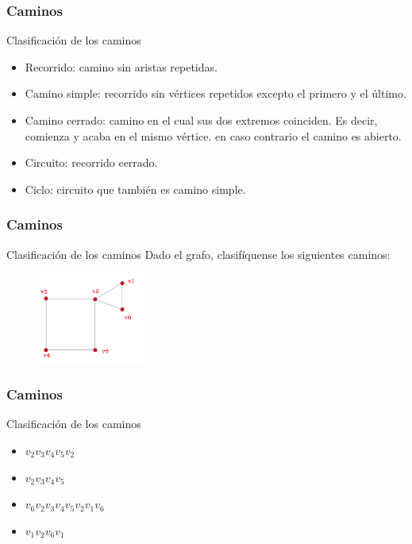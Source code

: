 \documentclass{beamer}
\begin{document}
\begin{frame}
\frametitle{Caminos}
\begin{block}{Clasificaci\'on de los caminos}
\begin{itemize}
\item Recorrido: camino sin aristas repetidas.
\item Camino simple: recorrido sin v\'ertices repetidos excepto el primero y el \'ultimo.
\item Camino cerrado: camino en el cual sus dos extremos coinciden. Es decir, comienza y acaba en el mismo v\'ertice. en caso contrario el camino es abierto.
\item Circuito: recorrido cerrado.
\item Ciclo: circuito que tambi\'en es camino simple.
\end{itemize}
\end{block}
\end{frame}






\begin{frame}
\frametitle{Caminos}
\begin{block}{Clasificaci\'on de los caminos}
Dado el grafo, clasif\'iquense los siguientes caminos:
\begin{figure}[h]
 \label{fig:volumen}
\centering
\includegraphics[height=3cm]{g7}
\end{figure}
\end{block}
\end{frame}



\begin{frame}
\frametitle{Caminos}
\begin{block}{Clasificaci\'on de los caminos}
\begin{itemize}
\item $v_2v_3v_4v_5v_2$
\item $v_2v_3v_4v_5$
\item $v_6v_2v_3v_4v_5v_2v_1v_6$
\item $v_1v_2v_6v_1$
\end{itemize}
\end{block}
\end{frame}
\end{document}
